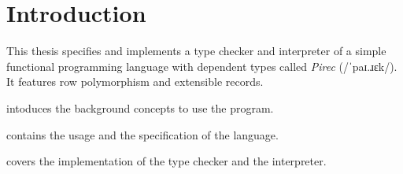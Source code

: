 \chapter{Introduction}\label{ch:introduction}

This thesis specifies and implements a type checker and interpreter of a simple
functional programming language with dependent types called \emph{Pirec}
(/ˈpaɪ.ɹɛk/). It features row polymorphism and extensible records.

 intoduces the background concepts to use the program.

 contains the usage and the specification of the language.

 covers the implementation of the type checker and the
interpreter.
